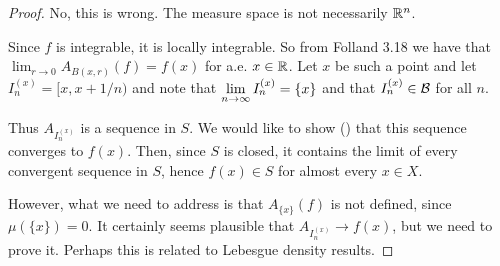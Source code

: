 \begin{proof}
   No, this is wrong. The measure space is not necessarily $\mathbb{R}^n$.

  Since $f$ is integrable, it is locally integrable. So from Folland 3.18 we have
  that $\lim_{r \to 0} A_{B(x, r)}(f) = f(x)$ for a.e. $x \in \mathbb{R}$. Let $x$ be such a point and
  let $I^{(x)}_n = [x, x + 1/n)$ and note that $\limninf I^{(x)}_n = \{x\}$ and that $I^{(x)}_n \in \mathcal B$ for
  all $n$.

  Thus $A_{I^{(x)}_n}$ is a sequence in $S$. We would like to show () that this sequence converges
  to $f(x)$. Then, since $S$ is closed, it contains the limit of every convergent sequence in $S$,
  hence $f(x) \in S$ for almost every $x \in X$.

   However, what we need to address is that $A_{\{x\}}(f)$ is not defined, since $\mu(\{x\}) = 0$. It
  certainly seems plausible that $A_{I^{(x)}_n} \to f(x)$, but we need to prove it. Perhaps this is related to
  Lebesgue density results.
\end{proof}
